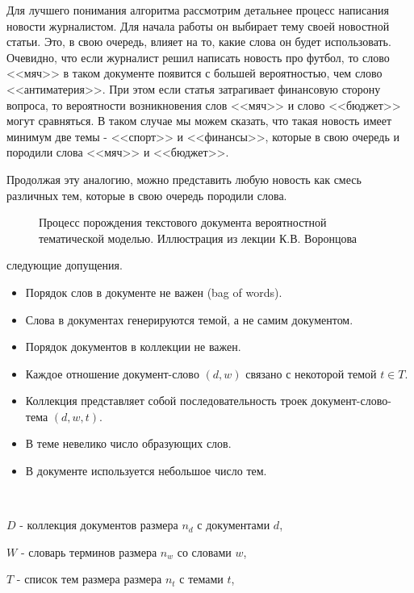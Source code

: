 Для лучшего понимания алгоритма рассмотрим детальнее процесс написания новости журналистом. Для начала работы он выбирает тему своей новостной статьи. Это, в свою очередь, влияет на то, какие слова он будет использовать. Очевидно, что если журналист решил написать новость про футбол, то слово <<мяч>> в таком документе появится с большей вероятностью, чем слово <<антиматерия>>. При этом если статья затрагивает финансовую сторону вопроса, то вероятности возникновения слов <<мяч>> и слово <<бюджет>> могут сравняться. В таком случае мы можем сказать,  что такая новость имеет минимум две темы - <<спорт>> и <<финансы>>, которые в свою очередь и породили слова <<мяч>> и <<бюджет>>. 

Продолжая эту аналогию, можно представить любую новость как смесь различных тем, которые в свою очередь породили слова. 

\begin{figure}[h]
\caption{Процесс порождения текстового документа вероятностной тематической моделью. Иллюстрация из лекции К.В. Воронцова}
\label{fig:image}
\end{figure}


 следующие допущения.

\begin{itemize}
    \item Порядок слов в документе не важен (bag of words).
    \item Слова в документах генерируются темой, а не самим документом.
    \item Порядок документов в коллекции не важен.
    \item Каждое отношение документ-слово $(d,w)$ связано с некоторой темой $t \in T$.
    \item Коллекция представляет собой последовательность троек документ-слово-тема $(d,w,t)$.
    \item В теме невелико число образующих слов.
    \item В документе используется небольшое число тем.
\end{itemize}

~\



 $D$ - коллекция документов размера $n_d$ с документами $d$,

 $W$ - словарь терминов размера $n_w$ со словами $w$,

 $T$ - список тем размера размера $n_t$ с темами $t$,

